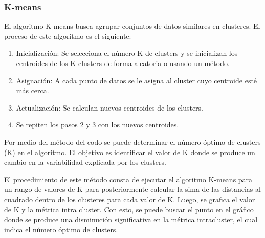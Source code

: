 \documentclass[a4paper, 12pt]{book}
\begin{document}
\subsubsection{K-means}
El algoritmo K-means busca agrupar conjuntos de datos similares en clusteres. El proceso de este algoritmo es el siguiente:
\begin{enumerate}
	\item Inicialización: Se selecciona el número K de clusters y se inicializan los centroides de los K clusters de forma aleatoria o usando un método.
	\item Asignación: A cada punto de datos se le asigna al cluster cuyo centroide esté más cerca.
	\item Actualización: Se calculan nuevos centroides de los clusters.
	\item Se repiten los pasos 2 y 3 con los nuevos centroides.
\end{enumerate}
Por medio del método del codo se puede determinar el número óptimo de clusters (K) en el algoritmo. El objetivo es identificar el valor de K donde se produce un cambio en la variabilidad explicada por los clusters.

El procedimiento de este método consta de ejecutar el algoritmo K-means para un rango de valores de K para posteriormente calcular la sima de las distancias al cuadrado dentro de los clusteres para cada valor de K. Luego, se grafica el valor de K y la métrica intra cluster. Con esto, se puede buscar el punto en el gráfico donde se produce una disminución significativa en la métrica intracluster, el cual indica el número óptimo de clusters.
\end{document}
